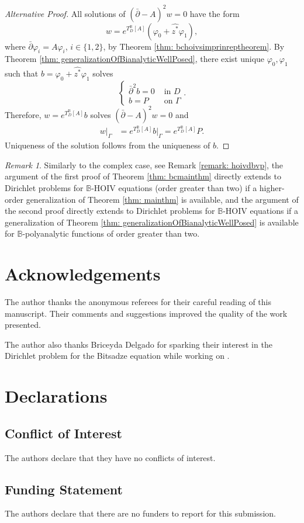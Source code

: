 \documentclass[12pt,reqno]{amsart}
\theoremstyle{definition}
\theoremstyle{remark}
\newtheorem{comm}[theorem]{Remark}
\newcommand{\dbar}{\bar\partial}
\newcommand{\bc}{\mathbb{B}}
\begin{document}
            \begin{proof}[Alternative Proof]
                All solutions of $(\dbar - A)^2 w = 0$ have the form 
                \[
                    w = e^{T_D^\bc[A]} (\varphi_0 + \widehat{z^*}\varphi_1),
                \]
                where $\dbar \varphi_i = A\varphi_i$, $i \in \{1,2\}$, by Theorem \ref{thm: bchoivsimprinreptheorem}. By Theorem \ref{thm: generalizationOfBianalyticWellPosed}, there exist unique $\varphi_0, \varphi_1$ such that $b = \varphi_0 + \widehat{z^*} \varphi_1$ solves
                \[
                    \begin{cases}
                        \dbar^2 b = 0 & \text{ in } D\\
                        b = P & \text{ on } \Gamma
                    \end{cases}.
                \]
                Therefore, $w = e^{T_D^\bc[A]} b$ solves $(\dbar - A)^2 w = 0$ and 
                \begin{align*}
                    w|_{\Gamma} &= e^{T_D^\bc[A]} b|_{\Gamma}
                    = e^{T_D^\bc[A]} P. 
                \end{align*}
                Uniqueness of the solution follows from the uniqueness of $b$. 
            \end{proof}

          
\begin{comm}
    Similarly to the complex case, see Remark \ref{remark: hoivdbvp}, the argument of the first proof of Theorem \ref{thm: bcmainthm} directly extends to Dirichlet problems for $\bc$-HOIV equations (order greater than two) if a higher-order generalization of Theorem \ref{thm: mainthm} is available, and the argument of the second proof directly extends to Dirichlet problems for $\bc$-HOIV equations if a generalization of Theorem \ref{thm: generalizationOfBianalyticWellPosed} is available for $\bc$-polyanalytic functions of order greater than two. 
\end{comm}



\section*{Acknowledgements}
The author thanks the anonymous referees for their careful reading of this manuscript. Their comments and suggestions improved the quality of the work presented.

The author also thanks Briceyda Delgado for sparking their interest in the Dirichlet problem for the Bitsadze equation while working on \cite{WBD2}.

\section*{Declarations}
\subsection*{Conflict of Interest}
The authors declare that they have no conflicts of interest.

\subsection*{Funding Statement}
The authors declare that there are no funders to report for this submission.





\printbibliography
\end{document}
